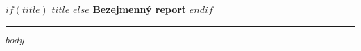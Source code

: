 \documentclass[a4paper]{article}
\begin{document}
\begin{center}
$if(title)$
\textbf{\LARGE $title$}
$else$
\textbf{\LARGE Bezejmenný report}
$endif$
\noindent\hfil\rule{.8\textwidth}{.25pt}\hfil
\end{center}

$body$
\end{document}
